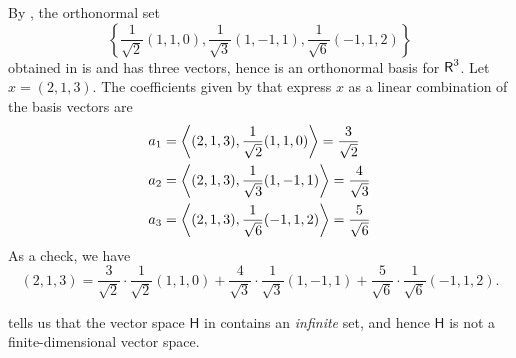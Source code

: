 \begin{example} \label{example 6.2.3}
By , the orthonormal set
\[
     \left\{ \frac{1}{\sqrt{2}}(1, 1, 0), \frac{1}{\sqrt{3}}(1, -1, 1), \frac{1}{\sqrt{6}}(-1, 1, 2) \right\}
\]
obtained in  is \LID{} and has three vectors, hence is an orthonormal basis for \(\textsf{R}^3\).
Let \(x = (2, 1, 3)\).
The coefficients given by  that express \(x\) as a linear combination of the basis vectors are
\begin{align*}
    a_1 & = \left< (2, 1, 3), \frac{1}{\sqrt{2}}(1, 1, 0) \right> = \frac{3}{\sqrt{2}}\\
    a_2 & = \left< (2, 1, 3), \frac{1}{\sqrt{3}}(1, -1, 1) \right> = \frac{4}{\sqrt{3}} \\
    a_3 & = \left< (2, 1, 3), \frac{1}{\sqrt{6}}(-1, 1, 2) \right> = \frac{5}{\sqrt{6}}
\end{align*}
As a check, we have
\[
    (2, 1, 3) = \frac{3}{\sqrt{2}} \cdot \frac{1}{\sqrt{2}}(1, 1, 0) + \frac{4}{\sqrt{3}} \cdot \frac{1}{\sqrt{3}}(1, -1, 1) + \frac{5}{\sqrt{6}} \cdot \frac{1}{\sqrt{6}}(-1, 1, 2).
\]
\end{example}

\begin{remark} \label{remark 6.2.1}
 tells us that the vector space \(\textsf{H}\) in  contains an \emph{infinite} \LID{} set, and hence \(\textsf{H}\) is not a finite-dimensional vector space.
\end{remark}

